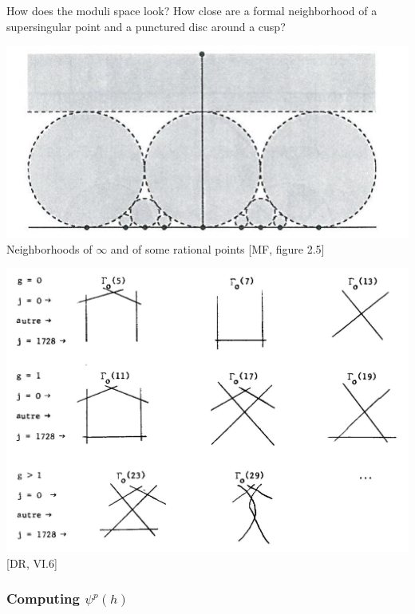 \documentclass{rs}
\theoremstyle{definition}
\theoremstyle{remark}
\renewcommand{\=}{\approx}
\renewcommand{\-}{\sim}
\numberwithin{equation}{section}
\numberwithin{thm}{section}
\begin{document}
How does the moduli space look?  
How close are a formal neighborhood of a supersingular point 
and a punctured disc around a cusp?  
\begin{center}
 \includegraphics[scale=.37]{cusps} \\
 {\small Neighborhoods of $\infty$ and of some rational points [MF, figure 2.5]} 
\end{center}
\begin{center}
 \includegraphics[scale=.24]{ssing} \\
 {\small [DR, VI.6]} 
\end{center}

\subsubsection*{Computing $\psi^p(h)$}
\end{document}
